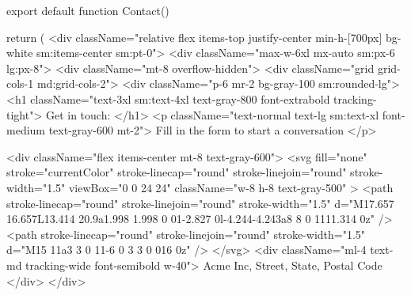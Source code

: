                     export default function Contact() {
                        return (
                            <div className="relative flex items-top justify-center min-h-[700px] bg-white sm:items-center sm:pt-0">
                                <div className="max-w-6xl mx-auto sm:px-6 lg:px-8">
                                    <div className="mt-8 overflow-hidden">
                                        <div className="grid grid-cols-1 md:grid-cols-2">
                                            <div className="p-6 mr-2 bg-gray-100 sm:rounded-lg">
                                                <h1 className="text-3xl sm:text-4xl text-gray-800 font-extrabold tracking-tight">
                                                    Get in touch: 
                                                </h1>
                                                <p className="text-normal text-lg sm:text-xl font-medium text-gray-600 mt-2">
                                                    Fill in the form to start a conversation
                                                </p>
                    
                                                <div className="flex items-center mt-8 text-gray-600">
                                                    <svg
                                                        fill="none"
                                                        stroke="currentColor"
                                                        stroke-linecap="round"
                                                        stroke-linejoin="round"
                                                        stroke-width="1.5"
                                                        viewBox="0 0 24 24"
                                                        className="w-8 h-8 text-gray-500"
                                                    >
                                                        <path
                                                            stroke-linecap="round"
                                                            stroke-linejoin="round"
                                                            stroke-width="1.5"
                                                            d="M17.657 16.657L13.414 20.9a1.998 1.998 0 01-2.827 0l-4.244-4.243a8 8 0 1111.314 0z"
                                                        />
                                                        <path
                                                            stroke-linecap="round"
                                                            stroke-linejoin="round"
                                                            stroke-width="1.5"
                                                            d="M15 11a3 3 0 11-6 0 3 3 0 016 0z"
                                                        />
                                                    </svg>
                                                    <div className="ml-4 text-md tracking-wide font-semibold w-40">
                                                        Acme Inc, Street, State, Postal Code
                                                    </div>
                                                </div>
                    
}
